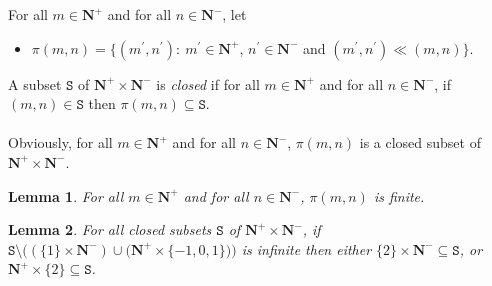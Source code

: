 \documentclass[draft]{article}
\newtheorem{lemma}{Lemma}
\begin{document}
For all $m{\in}\mathbf{N}^{+}$ and for all $n{\in}\mathbf{N}^{-}$, let
%
%
\begin{itemize}
%
%
\item $\pi(m,n){=}\{(m^{\prime},n^{\prime}):\ m^{\prime}{\in}\mathbf{N}^{+}$, $n^{\prime}{\in}\mathbf{N}^{-}$ and $(m^{\prime},n^{\prime}){\ll}(m,n)\}$.
%
%
\end{itemize}
%
%
A subset $\mathtt{S}$ of $\mathbf{N}^{+}{\times}\mathbf{N}^{-}$ is {\it closed}\/ if for all $m{\in}\mathbf{N}^{+}$ and for all $n{\in}\mathbf{N}^{-}$, if $(m,n){\in}\mathtt{S}$ then $\pi(m,n){\subseteq}\mathtt{S}$.
%
%
\\
\\
%
%
Obviously, for all $m{\in}\mathbf{N}^{+}$ and for all $n{\in}\mathbf{N}^{-}$, $\pi(m,n)$ is a closed subset of $\mathbf{N}^{+}{\times}\mathbf{N}^{-}$.
%
%
\begin{lemma}\label{lemma:ll:finitely:many:smaller:pairs}
%
%
For all $m{\in}\mathbf{N}^{+}$ and for all $n{\in}\mathbf{N}^{-}$, $\pi(m,n)$ is finite.
%
%
\end{lemma}
%
%
%
%
%
%
%
%
\begin{lemma}\label{lemma:if:S:L:setminus:some:pairs:is:infinite:then:two:consequences}
%
%
For all closed subsets $\mathtt{S}$ of $\mathbf{N}^{+}{\times}\mathbf{N}^{-}$, if $\mathtt{S}{\setminus}((\{1\}{\times}\mathbf{N}^{-}){\cup}(\mathbf{N}^{+}{\times}\{{-}1,0,
%
%
%
%
%
%
%
%
%
%
%
%
$\linebreak$
%
%
%
%
%
%
%
%
%
%
%
%
1\}))$ is infinite then either $\{2\}{\times}\mathbf{N}^{-}{\subseteq}\mathtt{S}$, or $\mathbf{N}^{+}{\times}\{2\}{\subseteq}\mathtt{S}$.
%
%
\end{lemma}
%
%
\end{document}
